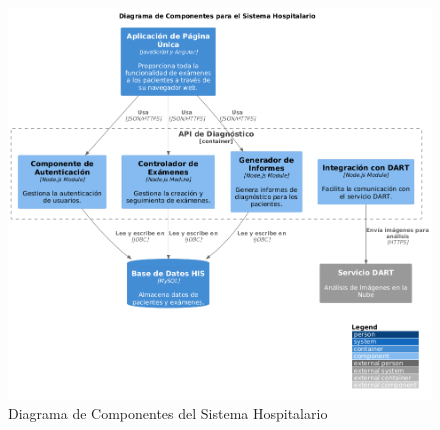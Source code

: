     \begin{figure}[h]
        \centering
        \includegraphics[width=\textwidth]{Pictures/component_diagram.png}
        \caption{Diagrama de Componentes del Sistema Hospitalario}
        \label{fig:component_diagram}
    \end{figure}























